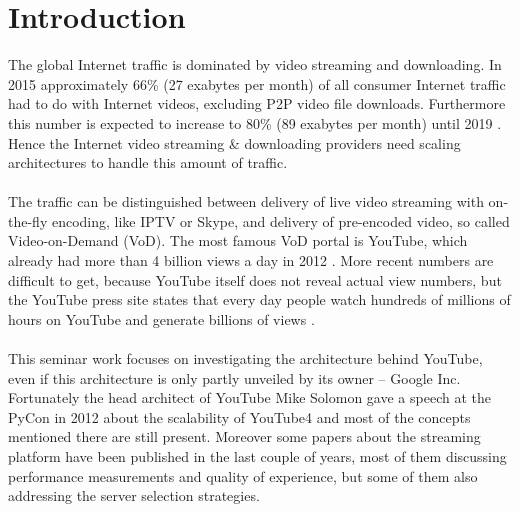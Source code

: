 \section{Introduction}

The global Internet traffic is dominated by video streaming and downloading. In 2015  approximately 66\% (27 exabytes per month) of all consumer Internet traffic had to do with Internet videos, excluding P2P video file downloads. Furthermore this number is expected to increase to 80\% (89 exabytes per month) until 2019 \cite{misc:cisco}. Hence the Internet video streaming \& downloading providers  need scaling architectures to handle this amount of traffic.
\\
\\
The traffic can be distinguished between delivery of live video streaming with on-the-fly encoding, like IPTV or Skype, and delivery of pre-encoded video, so called Video-on-Demand (VoD). The most famous VoD portal is YouTube, which already had more than 4 billion views a day in 2012 \cite{misc:scalibility_at_youtube}. More recent numbers are difficult to get, because YouTube itself does not reveal actual view numbers, but the YouTube press site states that every day people watch hundreds of millions of hours on YouTube and generate billions of views \cite{misc:youtube_press}.
\\
\\
This seminar work focuses on investigating the architecture behind YouTube, even if this architecture is only partly unveiled by its owner – Google Inc. Fortunately the head architect of YouTube Mike Solomon gave a speech at the PyCon in 2012 about the scalability of YouTube4 and most of the concepts mentioned there are still present. Moreover some papers about the streaming platform have been published in the last couple of years, most of them discussing performance measurements and quality of experience, but some of them also addressing the server selection strategies.
